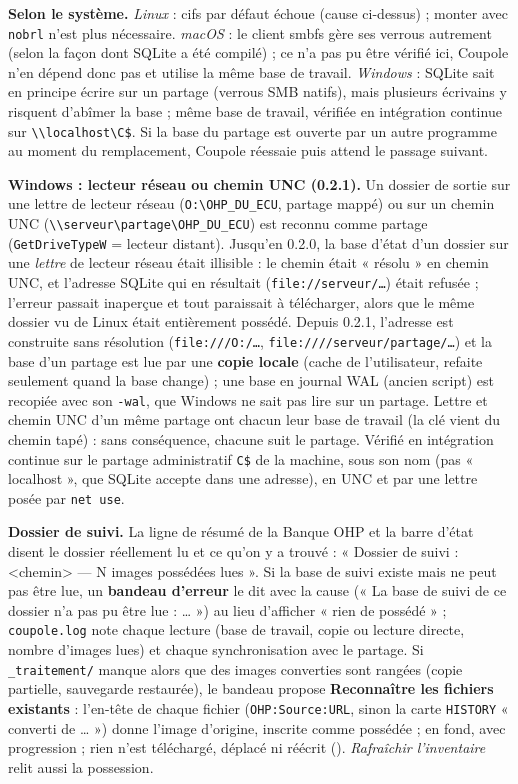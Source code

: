 \textbf{Selon le système.} \emph{Linux} : cifs par défaut échoue (cause ci-dessus) ; monter avec \texttt{nobrl}
n'est plus nécessaire. \emph{macOS} : le client smbfs gère ses verrous autrement (selon la façon dont SQLite a été
compilé) ; ce n'a pas pu être vérifié ici, Coupole n'en dépend donc pas et utilise la même base de travail.
\emph{Windows} : SQLite sait en principe écrire sur un partage (verrous SMB natifs), mais plusieurs écrivains y
risquent d'abîmer la base ; même base de travail, vérifiée en intégration continue sur
\texttt{\textbackslash\textbackslash localhost\textbackslash C\$}. Si la base du partage est ouverte par un autre
programme au moment du remplacement, Coupole réessaie puis attend le passage suivant.

\textbf{Windows : lecteur réseau ou chemin UNC (0.2.1).} Un dossier de sortie sur une lettre de lecteur réseau
(\texttt{O:\textbackslash OHP\_DU\_ECU}, partage mappé) ou sur un chemin UNC
(\texttt{\textbackslash\textbackslash serveur\textbackslash partage\textbackslash OHP\_DU\_ECU}) est reconnu comme
partage (\texttt{GetDriveTypeW} = lecteur distant). Jusqu'en 0.2.0, la base d'état d'un dossier sur une \emph{lettre}
de lecteur réseau était illisible : le chemin était « résolu » en chemin UNC, et l'adresse SQLite qui en résultait
(\texttt{file://serveur/…}) était refusée ; l'erreur passait inaperçue et tout paraissait à télécharger, alors que le
même dossier vu de Linux était entièrement possédé. Depuis 0.2.1, l'adresse est construite sans résolution
(\texttt{file:///O:/…}, \texttt{file:////serveur/partage/…}) et la base d'un partage est lue par une \textbf{copie
locale} (cache de l'utilisateur, refaite seulement quand la base change) ; une base en journal WAL (ancien script)
est recopiée avec son \texttt{-wal}, que Windows ne sait pas lire sur un partage. Lettre et chemin UNC d'un même
partage ont chacun leur base de travail (la clé vient du chemin tapé) : sans conséquence, chacune suit le partage.
Vérifié en intégration continue sur le partage administratif \texttt{C\$} de la machine, sous son nom (pas
« localhost », que SQLite accepte dans une adresse), en UNC et par une lettre posée par \texttt{net use}.

\textbf{Dossier de suivi.} La ligne de résumé de la Banque OHP et la barre d'état disent le dossier réellement lu et
ce qu'on y a trouvé : « Dossier de suivi : <chemin> --- N images possédées lues ». Si la base de suivi existe mais
ne peut pas être lue, un \textbf{bandeau d'erreur} le dit avec la cause (« La base de suivi de ce dossier n'a pas pu
être lue : … ») au lieu d'afficher « rien de possédé » ; \texttt{coupole.log} note chaque lecture (base de travail,
copie ou lecture directe, nombre d'images lues) et chaque synchronisation avec le partage. Si \texttt{\_traitement/}
manque alors que des images converties sont rangées (copie partielle, sauvegarde restaurée), le bandeau propose
\textbf{Reconnaître les fichiers existants} : l'en-tête de chaque fichier (\texttt{OHP:Source:URL}, sinon la carte
\texttt{HISTORY} « converti de … ») donne l'image d'origine, inscrite comme possédée ; en fond, avec progression ;
rien n'est téléchargé, déplacé ni réécrit (). \emph{Rafraîchir
l'inventaire} relit aussi la possession.

